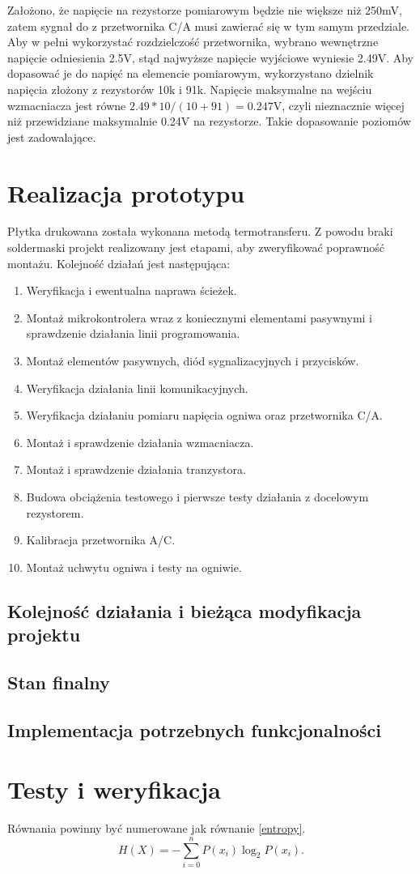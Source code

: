 \documentclass[polish,engineer]{polsl-msth}
\begin{document}
Założono, że napięcie na rezystorze pomiarowym będzie nie większe niż 250mV, zatem sygnał do z przetwornika C/A musi zawierać się w tym samym przedziale. Aby w pełni wykorzystać rozdzielczość przetwornika, wybrano wewnętrzne napięcie odniesienia 2.5V, stąd najwyższe napięcie wyjściowe wyniesie 2.49V. Aby dopasować je do napięć na elemencie pomiarowym, wykorzystano dzielnik napięcia złożony z rezystorów 10k i 91k. Napięcie maksymalne na wejściu wzmacniacza jest równe $2.49*10/(10+91) = 0.247$V, czyli nieznacznie więcej niż przewidziane maksymalnie 0.24V na rezystorze. Takie dopasowanie poziomów jest zadowalające.
\chapter{Realizacja prototypu}
Płytka drukowana została wykonana metodą termotransferu. Z powodu braki soldermaski projekt realizowany jest etapami, aby zweryfikować poprawność montażu. Kolejność działań jest następująca:
\begin{enumerate}
    \item Weryfikacja i ewentualna naprawa ścieżek.
    \item Montaż mikrokontrolera wraz z koniecznymi elementami pasywnymi i sprawdzenie działania linii programowania.
    \item Montaż elementów pasywnych, diód sygnalizacyjnych i przycisków.
    \item Weryfikacja działania linii komunikacyjnych.
    \item Weryfikacja działaniu pomiaru napięcia ogniwa oraz przetwornika C/A.
    \item Montaż i sprawdzenie działania wzmacniacza.
    \item Montaż i sprawdzenie działania tranzystora.
    \item Budowa obciążenia testowego i pierwsze testy działania z docelowym rezystorem.
    \item Kalibracja przetwornika A/C.
    \item Montaż uchwytu ogniwa i testy na ogniwie.
    
\end{enumerate}
\section{Kolejność działania i bieżąca modyfikacja projektu}
\section{Stan finalny}
\section{Implementacja potrzebnych funkcjonalności}

\chapter{Testy i weryfikacja}




\newpage


Równania powinny być numerowane jak równanie \ref{entropy}.
\begin{equation}
H(X) = -\sum_{i=0}^n P(x_i) \log_2 P(x_i).\label{entropy}
\end{equation}
\end{document}
